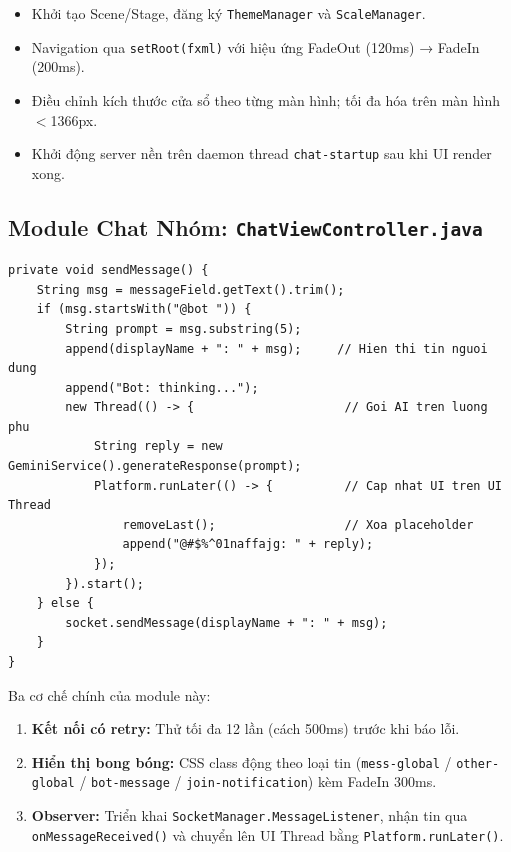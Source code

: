 \documentclass[12pt, a4paper, oneside]{report}
\newcommand{\code}[1]{\texttt{\color{hustblue!80!black}#1}}
\begin{document}
\begin{itemize}[leftmargin=2em, itemsep=4pt]
  \item Khởi tạo Scene/Stage, đăng ký \code{ThemeManager} và \code{ScaleManager}.
  \item Navigation qua \code{setRoot(fxml)} với hiệu ứng FadeOut (120ms) → FadeIn (200ms).
  \item Điều chỉnh kích thước cửa sổ theo từng màn hình; tối đa hóa trên màn hình $<$1366px.
  \item Khởi động server nền trên daemon thread \code{chat-startup} sau khi UI render xong.
\end{itemize}

\subsection{Module Chat Nhóm: \texttt{ChatViewController.java}}

\begin{lstlisting}[caption={Xử lý gửi tin nhắn với cú pháp @bot},
                   label=lst:sendmsg, style=javastyle]
private void sendMessage() {
    String msg = messageField.getText().trim();
    if (msg.startsWith("@bot ")) {
        String prompt = msg.substring(5);
        append(displayName + ": " + msg);     // Hien thi tin nguoi dung
        append("Bot: thinking...");
        new Thread(() -> {                     // Goi AI tren luong phu
            String reply = new GeminiService().generateResponse(prompt);
            Platform.runLater(() -> {          // Cap nhat UI tren UI Thread
                removeLast();                  // Xoa placeholder
                append("@#$%^01naffajg: " + reply);
            });
        }).start();
    } else {
        socket.sendMessage(displayName + ": " + msg);
    }
}
\end{lstlisting}

Ba cơ chế chính của module này:
\begin{enumerate}[leftmargin=2em, itemsep=4pt]
  \item \textbf{Kết nối có retry:} Thử tối đa 12 lần (cách 500ms) trước khi
    báo lỗi.
  \item \textbf{Hiển thị bong bóng:} CSS class động theo loại tin
    (\code{mess-global} / \code{other-global} / \code{bot-message} /
    \code{join-notification}) kèm FadeIn 300ms.
  \item \textbf{Observer:} Triển khai \code{SocketManager.MessageListener},
    nhận tin qua \code{onMessageReceived()} và chuyển lên UI Thread bằng
    \code{Platform.runLater()}.
\end{enumerate}
\end{document}
